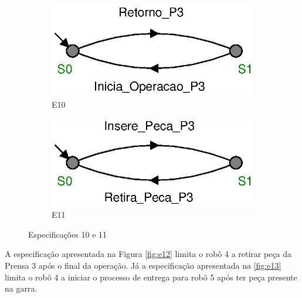 \begin{figure}[H]%
  \centering
  \begin{subfigure}{0.45\textwidth}
      \centering
      \includegraphics[width=\textwidth]{imagens/E10.eps}
      \caption{E10}
      \label{fig:e10}
  \end{subfigure}
  \hfill
  \begin{subfigure}{0.45\textwidth}
      \centering
      \includegraphics[width=\textwidth]{imagens/E11.eps}
      \caption{E11}
      \label{fig:e11}
  \end{subfigure}
  \caption{Especificações 10 e 11}
  \label{fig:e1011}
\end{figure}

A especificação apresentada na Figura \ref{fig:e12} limita o robô 4 a retirar peça da Prensa 3 após o final da operação.
Já a especificação apresentada na \ref{fig:e13} limita o robô 4 a iniciar o processo de entrega para robô 5 após ter peça presente na garra.

